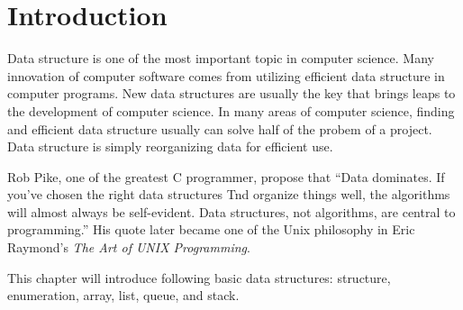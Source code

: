 \documentclass[../main.tex]{subfiles}
\begin{document}
\section{Introduction}
Data structure is one of the most important topic in computer science. Many
innovation of computer software comes from utilizing efficient data structure in
computer programs. New data structures are usually the key that brings leaps to
the development of computer science. In many areas of computer science, finding
and efficient data structure usually can solve half of the probem of a project.
Data structure is simply reorganizing data for efficient use.

Rob Pike, one of the greatest C programmer, propose that ``Data dominates. If
you've chosen the right data structures Tnd organize things well, the algorithms
will almost always be self-evident. Data structures, not algorithms, are central
to programming.'' His quote later became one of the Unix philosophy in Eric
Raymond's \emph{The Art of UNIX Programming}.

This chapter will introduce following basic data structures: structure, enumeration,
array, list, queue, and stack.
\end{document}
